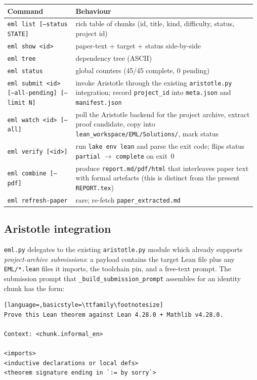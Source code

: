 \documentclass[11pt,a4paper]{article}
\theoremstyle{plain}
\theoremstyle{definition}
\begin{document}
\begin{center}
\begin{tabular}{@{}lp{}@{}}
\toprule
\textbf{Command} & \textbf{Behaviour}\\
\midrule
\texttt{eml list [--status STATE]} & rich table of chunks (id, title,
kind, difficulty, status, project id) \\
\texttt{eml show <id>} & paper-text + target + status side-by-side \\
\texttt{eml tree} & dependency tree (ASCII) \\
\texttt{eml status} & global counters (45/45 complete, 0 pending) \\
\texttt{eml submit <id> [--all-pending] [--limit N]} & invoke Aristotle
through the existing \texttt{aristotle.py} integration; record
\texttt{project\_id} into \texttt{meta.json} and \texttt{manifest.json} \\
\texttt{eml watch <id> [--all]} & poll the Aristotle backend for the
project archive, extract proof candidate, copy into
\texttt{lean\_workspace/EML/Solutions/}, mark status \\
\texttt{eml verify [<id>]} & run \texttt{lake env lean} and parse the
exit code; flips status \texttt{partial} $\to$ \texttt{complete} on
exit~0 \\
\texttt{eml combine [--pdf]} & produce \texttt{report.md/pdf/html} that
interleaves paper text with formal artefacts (this is distinct from the
present \texttt{REPORT.tex})\\
\texttt{eml refresh-paper} & rare; re-fetch \texttt{paper\_extracted.md}\\
\bottomrule
\end{tabular}
\end{center}

\subsection{Aristotle integration}

\texttt{eml.py} delegates to the existing \texttt{aristotle.py} module
which already supports \emph{project-archive submissions}: a payload
contains the target Lean file plus any \texttt{EML/*.lean} files it
imports, the toolchain pin, and a free-text prompt.  The submission
prompt that \texttt{\_build\_submission\_prompt} assembles for an
identity chunk has the form:

\begin{lstlisting}[language=,basicstyle=\ttfamily\footnotesize]
Prove this Lean theorem against Lean 4.28.0 + Mathlib v4.28.0.

Context: <chunk.informal_en>

<imports>
<inductive declarations or local defs>
<theorem signature ending in `:= by sorry`>
\end{lstlisting}
\end{document}
